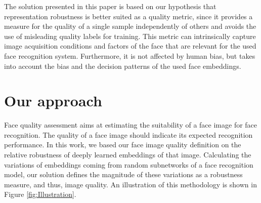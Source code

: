 \documentclass[10pt,twocolumn,letterpaper]{article}
\begin{document}
The solution presented in this paper is based on our hypothesis that representation robustness is better suited as a quality metric, since it provides a measure for the quality of a single sample independently of others and avoids the use of misleading quality labels for training. 
This metric can intrinsically capture image acquisition conditions and factors of the face that are relevant for the used face recognition system.
Furthermore, it is not affected by human bias, but takes into account the bias and the decision patterns of the used face embeddings.


























































\section{Our approach}

















Face quality assessment aims at estimating the suitability of a face image for face recognition.
The quality of a face image should indicate its expected recognition performance.
In this work, we based our face image quality definition on the relative robustness of deeply learned embeddings of that image.
Calculating the variations of embeddings coming from random subnetworks of a face recognition model, our solution defines the magnitude of these variations as a robustness measure, and thus, image quality.
An illustration of this methodology is shown in Figure \ref{fig:Illustration}. 
\end{document}
